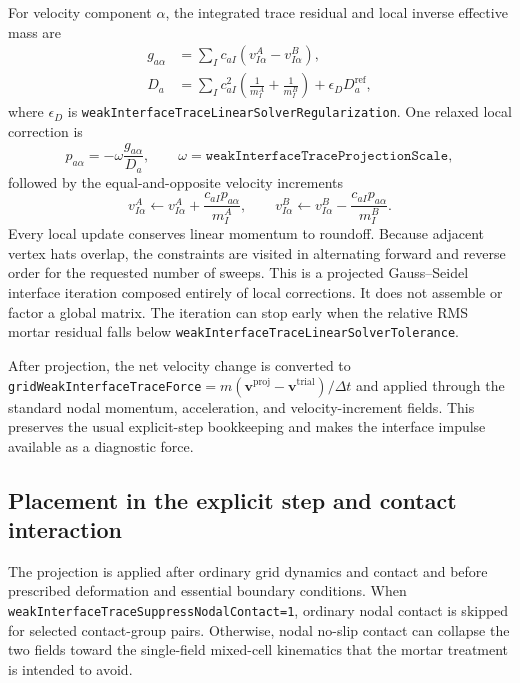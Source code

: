 For velocity component $\alpha$, the integrated trace residual and local
inverse effective mass are
\begin{align}
  g_{a\alpha} & =
  \sum_I c_{aI}\left(v_{I\alpha}^A-v_{I\alpha}^B\right),
  \label{eq:weak-trace-mortar-residual}\\
  D_a & =
  \sum_I c_{aI}^2\left(\frac{1}{m_I^A}+\frac{1}{m_I^B}\right)
  + \epsilon_D D_a^{\mathrm{ref}},
  \label{eq:weak-trace-mortar-denominator}
\end{align}
where $\epsilon_D$ is
\texttt{weakInterfaceTraceLinearSolverRegularization}.  One relaxed local
correction is
\begin{equation}
  p_{a\alpha}=-\omega\frac{g_{a\alpha}}{D_a},
  \qquad
  \omega=\texttt{weakInterfaceTraceProjectionScale},
  \label{eq:weak-trace-mortar-impulse}
\end{equation}
followed by the equal-and-opposite velocity increments
\begin{equation}
  v_{I\alpha}^A \leftarrow v_{I\alpha}^A+
    \frac{c_{aI}p_{a\alpha}}{m_I^A},
  \qquad
  v_{I\alpha}^B \leftarrow v_{I\alpha}^B-
    \frac{c_{aI}p_{a\alpha}}{m_I^B}.
  \label{eq:weak-trace-mortar-scatter}
\end{equation}
Every local update conserves linear momentum to roundoff.  Because adjacent
vertex hats overlap, the constraints are visited in alternating forward and
reverse order for the requested number of sweeps.  This is a projected
Gauss--Seidel interface iteration composed entirely of local corrections.  It
does not assemble or factor a global matrix.  The iteration can stop early when
the relative RMS mortar residual falls below
\texttt{weakInterfaceTraceLinearSolverTolerance}.

After projection, the net velocity change is converted to
\texttt{gridWeakInterfaceTraceForce}$=m(\mathbf{v}^{\mathrm{proj}}-
\mathbf{v}^{\mathrm{trial}})/\Delta t$ and applied through the standard nodal
momentum, acceleration, and velocity-increment fields.  This preserves the
usual explicit-step bookkeeping and makes the interface impulse available as a
diagnostic force.

\subsection{Placement in the explicit step and contact interaction}

The projection is applied after ordinary grid dynamics and contact and before
prescribed deformation and essential boundary conditions.  When
\texttt{weakInterfaceTraceSuppressNodalContact=1}, ordinary nodal contact is
skipped for selected contact-group pairs.  Otherwise, nodal no-slip contact can
collapse the two fields toward the single-field mixed-cell kinematics that the
mortar treatment is intended to avoid.

